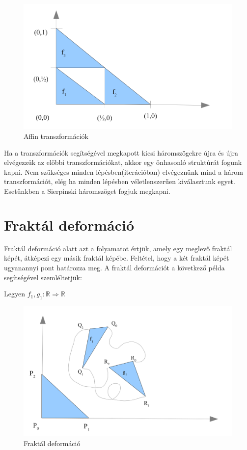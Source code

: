 \begin{figure}[H]
	\centering	
	\includegraphics[scale=0.35]{Images/Grafikon2}
	\caption{Affin transzformációk}
\end{figure}


Ha a transzformációk segítségével megkapott kicsi háromszögekre újra és újra elvégezzük az előbbi
transzformációkat, akkor egy önhasonló struktúrát fogunk kapni. Nem szükséges minden lépésben(iterációban) elvégeznünk mind a három transzformációt, elég ha minden lépésben véletlenszerűen
kiválasztunk egyet. Esetünkben a Sierpinski háromszöget fogjuk megkapni.

\section{Fraktál deformáció}
Fraktál deformáció alatt azt a folyamatot értjük, amely egy meglevő fraktál képét, átképezi egy másik
fraktál képébe. Feltétel, hogy a két fraktál képét ugyanannyi pont határozza meg. A fraktál deformációt
a következő példa segítségével szemléltetjük:

Legyen $f_{1}, g_{1}: \mathbb{R} \Rightarrow \mathbb{R}$

\begin{figure}[H]
	\centering	
	\includegraphics[scale=0.4]{Images/Grafikon3}
	\caption{Fraktál deformáció}
\end{figure}

